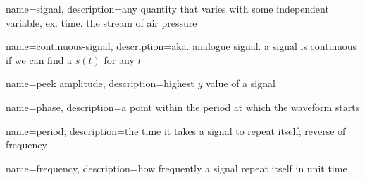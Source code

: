 {
  name=signal,
  description={any quantity that varies with some independent variable, ex. time.
  the stream of air pressure}
}

{
  name=continuous-signal,
  description={aka. analogue signal. a signal is continuous if we can find
  a $ s \left( t \right) $ for any $ t $}
}

{
  name=peek amplitude,
  description={highest $ y $ value of a signal}
}

{
  name=phase,
  description={a point within the period at which the waveform starts}
}

{
  name=period,
  description={the time it takes a signal to repeat itself; reverse of
  frequency}
}

{
  name=frequency,
  description={how frequently a signal repeat itself in unit time}
}
